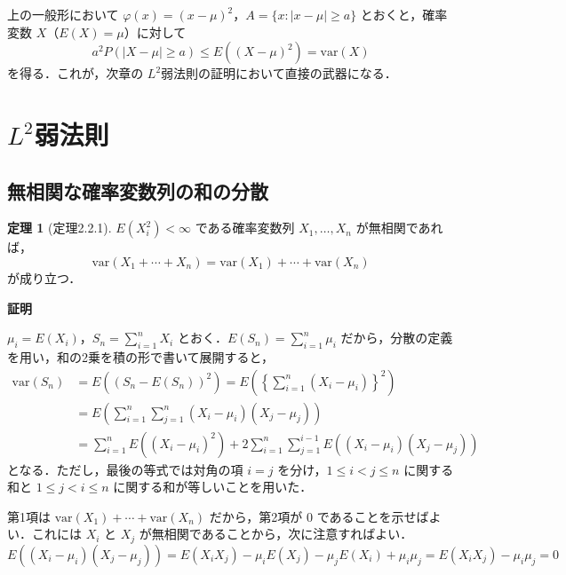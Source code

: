 \documentclass[dvipdfmx]{jsarticle}
\makeatletter
\numberwithin{equation}{section}
\theoremstyle{definition}
\newtheorem{thm}{定理}[section]
\renewenvironment{proof}[1][\proofname]{\par
  \pushQED{\qed}%
  \normalfont \topsep6\p@\@plus6\p@\relax
  \trivlist
  \item\relax
  {\bfseries
  #1\@addpunct{.}}\hspace\labelsep\ignorespaces
}{%
  \popQED\endtrivlist\@endpefalse
}
\renewcommand{\proofname}{証明}
\newcommand{\0}{\bm{0}}
\newcommand{\1}{\bm{1}}
\makeatother
\begin{document}
上の一般形において $\varphi(x) = (x-\mu)^2$，$A = \{x : |x - \mu| \ge a\}$ とおくと，確率変数 $X$（$E(X) = \mu$）に対して
\[
  a^2 P(|X - \mu| \ge a) \le E\!\left((X-\mu)^2\right) = \mathrm{var}(X)
\]
を得る．これが，次章の $L^2$弱法則の証明において直接の武器になる．

\section{\texorpdfstring{$L^2$}{L2}弱法則}

\subsection{無相関な確率変数列の和の分散}

\begin{thm}[定理2.2.1]
$E(X_i^2) < \infty$ である確率変数列 $X_1,\dots,X_n$ が無相関であれば，
\[
  \mathrm{var}(X_1 + \cdots + X_n) = \mathrm{var}(X_1) + \cdots + \mathrm{var}(X_n)
\]
が成り立つ．
\end{thm}

\begin{proof}
$\mu_i = E(X_i)$，$S_n = \sum_{i=1}^n X_i$ とおく．$E(S_n) = \sum_{i=1}^n \mu_i$ だから，分散の定義を用い，和の2乗を積の形で書いて展開すると，
\begin{align*}
  \mathrm{var}(S_n)
  &= E\!\left((S_n - E(S_n))^2\right)
   = E\!\left(\left\{\sum_{i=1}^n (X_i - \mu_i)\right\}^2\right) \\
  &= E\!\left(\sum_{i=1}^n \sum_{j=1}^n (X_i - \mu_i)(X_j - \mu_j)\right) \\
  &= \sum_{i=1}^n E\!\left((X_i - \mu_i)^2\right) + 2\sum_{i=1}^n \sum_{j=1}^{i-1} E\!\left((X_i - \mu_i)(X_j - \mu_j)\right)
\end{align*}
となる．ただし，最後の等式では対角の項 $i=j$ を分け，$1 \le i < j \le n$ に関する和と $1 \le j < i \le n$ に関する和が等しいことを用いた．

第1項は $\mathrm{var}(X_1) + \cdots + \mathrm{var}(X_n)$ だから，第2項が $0$ であることを示せばよい．これには $X_i$ と $X_j$ が無相関であることから，次に注意すればよい．
\[
  E\!\left((X_i - \mu_i)(X_j - \mu_j)\right)
  = E(X_iX_j) - \mu_i E(X_j) - \mu_j E(X_i) + \mu_i\mu_j
  = E(X_iX_j) - \mu_i\mu_j = 0
\]
\end{proof}
\end{document}
